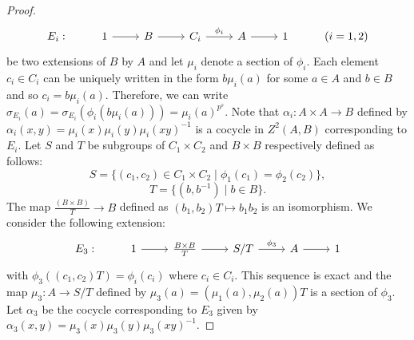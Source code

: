 \documentclass[preprint,sort&compress,12pt]{elsarticle}
\numberwithin{equation}{section}
\theoremstyle{definition}
\begin{document}
\begin{proof}
\[
\begin{tikzcd}
  E_i:& 1 \arrow[r] & B \arrow[r] & C_i \arrow[r, "\phi_i"] & A \ar[r] & 1 & (i=1,2)
\end{tikzcd}
\]
be two extensions of $B$ by $A$ and let $\mu_i$ denote a section of $\phi_i$. 
Each element $c_i \in C_i$ can be uniquely written in the form $b\mu_i(a)$ for some $a \in A$ and $b \in B$ and so $c_i=b\mu_i(a)$. Therefore, we can write ${\sigma_{E_i}(a)=\sigma_{E_i}(\phi_i(b\mu_i(a)))=\mu_i(a)^{p^s}}$. Note that $\alpha_i:A \times A \to B$ defined by $\alpha_i(x,y)=\mu_i(x)\mu_i(y)\mu_i(xy)^{-1}$ is a cocycle in $Z^2(A,B)$ corresponding to $E_i$. Let $S$ and $T$ be subgroups of $C_1 \times C_2$ and $B \times B$ respectively defined as follows:
\[
S=\{(c_1,c_2) \in C_1 \times C_2 \mid \phi_1(c_1)=\phi_2(c_2)\},
\]
\[
T=\{(b,b^{-1})\mid b \in B\}.
\]
The map $\frac{(B \times B)}{T} \to B$ defined as $(b_1,b_2)T \mapsto b_1b_2$ is an isomorphism. We consider the following extension:
\[
\begin{tikzcd}
  E_3:& 1 \arrow[r] & \frac{B \times B}{T} \arrow[r] & S/T \arrow[r, "\phi_3"] & A \ar[r] & 1 
\end{tikzcd}
\]
with $\phi_3((c_1,c_2)T)=\phi_i(c_i)$ where $c_i \in C_i$. This sequence is exact and the map $\mu_3:A \to S/T$ defined by $\mu_3(a)=(\mu_1(a),\mu_2(a))T$ is a section of $\phi_3$. Let $\alpha_3$ be the cocycle corresponding to $E_3$ given by $\alpha_3(x,y)=\mu_3(x)\mu_3(y)\mu_3(xy)^{-1}$. 

\end{proof}
\end{document}
